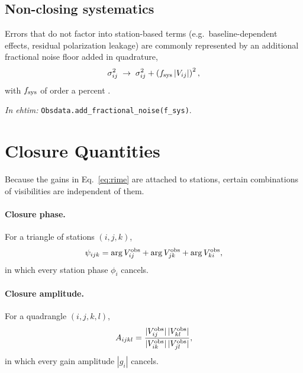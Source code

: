 \documentclass[11pt]{article}
\newcommand{\ehtimnote}[1]{%
  \par\smallskip\noindent
  \colorbox{gray!12}{\parbox{\dimexpr\linewidth-2\fboxsep}{\small\textit{In ehtim:} #1}}%
  \par\smallskip}
\begin{document}
\subsection{Non-closing systematics}

Errors that do not factor into station-based terms (e.g.\ baseline-dependent
effects, residual polarization leakage) are commonly represented by an
additional fractional noise floor added in quadrature,
\begin{equation}
\sigma_{ij}^2 \;\to\; \sigma_{ij}^2 + \left(f_{\rm sys}\,|V_{ij}|\right)^2,
\end{equation}
with $f_{\rm sys}$ of order a percent \cite{EHT2019IV}.

\ehtimnote{\texttt{Obsdata.add\_fractional\_noise(f\_sys)}.}

\section{Closure Quantities}

Because the gains in Eq.~\eqref{eq:rime} are attached to stations, certain
combinations of visibilities are independent of them.

\paragraph{Closure phase.} For a triangle of stations $(i,j,k)$,
\begin{equation}
\psi_{ijk} = \arg V_{ij}^{\rm obs} + \arg V_{jk}^{\rm obs} + \arg V_{ki}^{\rm obs},
\end{equation}
in which every station phase $\phi_i$ cancels.

\paragraph{Closure amplitude.} For a quadrangle $(i,j,k,l)$,
\begin{equation}
A_{ijkl} = \frac{|V_{ij}^{\rm obs}|\,|V_{kl}^{\rm obs}|}{|V_{ik}^{\rm obs}|\,|V_{jl}^{\rm obs}|},
\end{equation}
in which every gain amplitude $|g_i|$ cancels.
\end{document}
